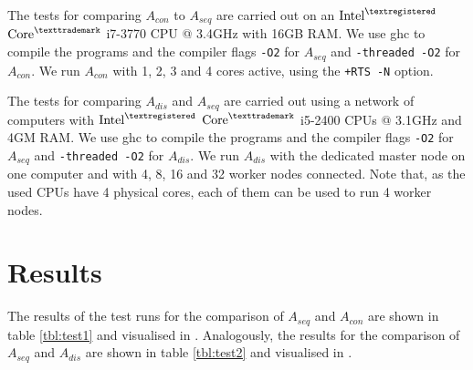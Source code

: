 The tests for comparing $A_{con}$ to $A_{seq}$ are carried out on an $\text{Intel}^{\textregistered}$ $\text{Core}^{\texttrademark}$ i7-3770 CPU @ 3.4GHz with 16GB RAM. We use \textsf{ghc} to compile the programs and the compiler flags \texttt{-O2} for $A_{seq}$ and \texttt{-threaded -O2} for $A_{con}$. We run $A_{con}$ with 1, 2, 3 and 4 cores active, using the \texttt{+RTS -N} option.

The tests for comparing $A_{dis}$ and $A_{seq}$ are carried out using a network of computers with $\text{Intel}^{\textregistered}$ $\text{Core}^{\texttrademark}$ i5-2400 CPUs @ 3.1GHz and 4GM RAM. We use \textsf{ghc} to compile the programs and the compiler flags \texttt{-O2} for $A_{seq}$ and \texttt{-threaded -O2} for $A_{dis}$. We run $A_{dis}$ with the dedicated master node on one computer and with 4, 8, 16 and 32 worker nodes connected. Note that, as the used CPUs have 4 physical cores, each of them can be used to run 4 worker nodes.

\vspace*{-1em}
\section{Results}
The results of the test runs for the comparison of $A_{seq}$ and $A_{con}$ are shown in table \ref{tbl:test1} and visualised in . Analogously, the results for the comparison of $A_{seq}$ and $A_{dis}$ are shown in table \ref{tbl:test2} and visualised in .

